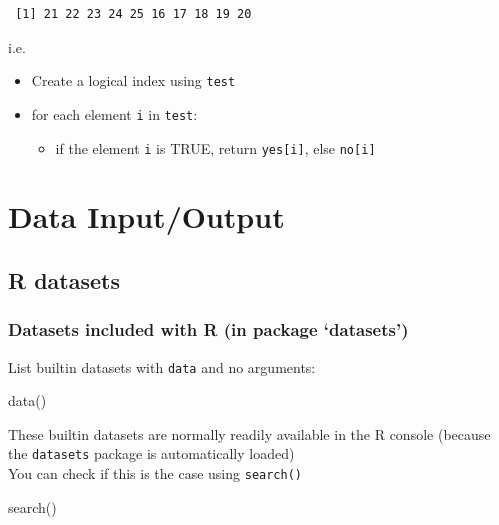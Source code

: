 \documentclass[
]{book}
\newenvironment{Shaded}{\begin{snugshade}}{\end{snugshade}}
\newcommand{\FunctionTok}[1]{\textcolor[rgb]{0.00,0.00,0.00}{#1}}
\newcommand{\NormalTok}[1]{#1}
\providecommand{\tightlist}{%
  \setlength{\itemsep}{0pt}\setlength{\parskip}{0pt}}
\begin{document}
\begin{verbatim}
 [1] 21 22 23 24 25 16 17 18 19 20
\end{verbatim}

i.e.

\begin{itemize}
\tightlist
\item
  Create a logical index using \texttt{test}
\item
  for each element \texttt{i} in \texttt{test}:

  \begin{itemize}
  \tightlist
  \item
    if the element \texttt{i} is TRUE, return \texttt{yes{[}i{]}}, else \texttt{no{[}i{]}}
  \end{itemize}
\end{itemize}

\hypertarget{dataio}{%
\chapter{Data Input/Output}\label{dataio}}

\hypertarget{r-datasets}{%
\section{R datasets}\label{r-datasets}}

\hypertarget{datasets-included-with-r-in-package-datasets}{%
\subsection{Datasets included with R (in package `datasets')}\label{datasets-included-with-r-in-package-datasets}}

List builtin datasets with \texttt{data} and no arguments:

\begin{Shaded}
\begin{Highlighting}[]
\FunctionTok{data}\NormalTok{()}
\end{Highlighting}
\end{Shaded}

These builtin datasets are normally readily available in the R console (because the \texttt{datasets} package is automatically loaded)\\
You can check if this is the case using \texttt{search()}

\begin{Shaded}
\begin{Highlighting}[]
\FunctionTok{search}\NormalTok{()}
\end{Highlighting}
\end{Shaded}
\end{document}

